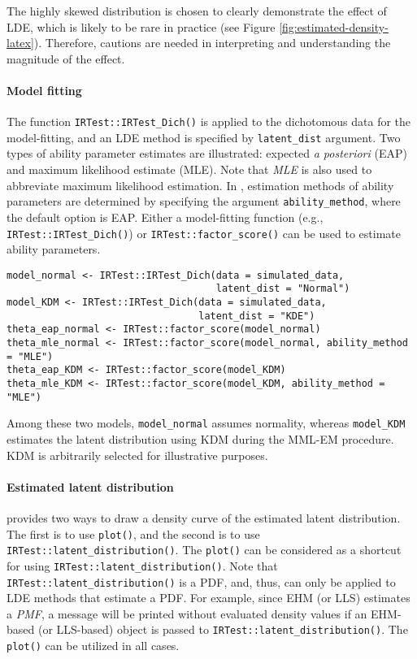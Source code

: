 The highly skewed distribution is chosen to clearly demonstrate
the effect of LDE, which is likely to be rare in
practice (see Figure
\ref{fig:estimated-density-latex}).
Therefore, cautions are needed in interpreting and understanding the magnitude of the effect.

\hypertarget{model-fitting}{%
\paragraph{Model fitting}\label{model-fitting}}

The function \texttt{IRTest::IRTest\_Dich()} is applied to the dichotomous data
for the model-fitting, and an LDE method is specified by
\texttt{latent\_dist} argument. Two types of ability parameter estimates are illustrated:
expected \emph{a posteriori} (EAP) and maximum likelihood estimate (MLE). Note that \emph{MLE}
is also used to abbreviate maximum likelihood estimation. In , estimation
methods of ability parameters are determined by specifying the argument
\texttt{ability\_method}, where the default option is EAP. Either a
model-fitting function (e.g., \texttt{IRTest::IRTest\_Dich()}) or \texttt{IRTest::factor\_score()} can be
used to estimate ability parameters.

\begin{verbatim}
model_normal <- IRTest::IRTest_Dich(data = simulated_data,
                                    latent_dist = "Normal")
model_KDM <- IRTest::IRTest_Dich(data = simulated_data,
                                 latent_dist = "KDE")
theta_eap_normal <- IRTest::factor_score(model_normal)
theta_mle_normal <- IRTest::factor_score(model_normal, ability_method = "MLE")
theta_eap_KDM <- IRTest::factor_score(model_KDM)
theta_mle_KDM <- IRTest::factor_score(model_KDM, ability_method = "MLE")
\end{verbatim}

Among these two models, \texttt{model\_normal} assumes normality,
whereas \texttt{model\_KDM} estimates the latent distribution using KDM during the
MML-EM procedure. KDM is arbitrarily selected for illustrative purposes.

\hypertarget{estimated-latent-distribution}{%
\paragraph{Estimated latent distribution}\label{estimated-latent-distribution}}

 provides two ways to draw a density curve of the
estimated latent distribution. The first is to use \texttt{plot()}, and the
second is to use \texttt{IRTest::latent\_distribution()}. The \texttt{plot()} can be considered
as a shortcut for using \texttt{IRTest::latent\_distribution()}. Note that
\texttt{IRTest::latent\_distribution()} is a PDF, and, thus, can only be applied to LDE
methods that estimate a PDF. For example, since EHM (or LLS) estimates
a \emph{PMF}, a message will be printed without evaluated density values if an
EHM-based (or LLS-based) object is passed to
\texttt{IRTest::latent\_distribution()}. The \texttt{plot()} can be utilized in all
cases.

